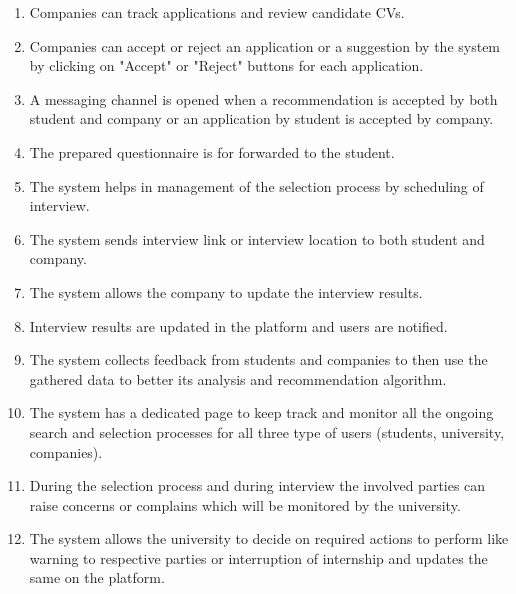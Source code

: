 \begin{enumerate}[label=R{\arabic*}]
    \item Companies can track applications and review candidate CVs.
    \item Companies can accept or reject an application or a suggestion by the system by clicking on "Accept" or "Reject" buttons for each application.
    \item A messaging channel is opened when a recommendation is accepted by both student and company or an application by student is accepted by company.
    \item The prepared questionnaire is for forwarded to the student.
    \item The system helps in management of the selection process by scheduling of interview.
    \item The system sends interview link or interview location to both student and company.
    \item The system allows the company to update the interview results.
    \item Interview results are updated in the platform and users are notified.
    \item The system collects feedback from students and companies to then use the gathered data to better its analysis and recommendation algorithm.
    \item The system has a dedicated page to keep track and monitor all the ongoing search and selection processes for all three type of users (students, university, companies).
    \item During the selection process and during interview the involved parties can raise concerns or complains which will be monitored by the university.
    \item The system allows the university to decide on required actions to perform like warning to respective parties or interruption of internship and updates the same on the platform.
\end{enumerate}

